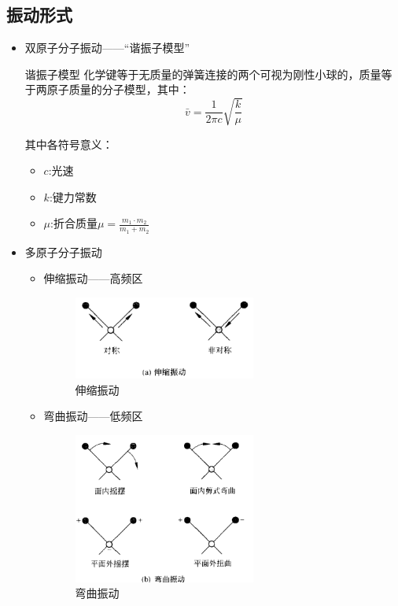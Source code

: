 \subsection{振动形式}
\begin{itemize}
    \item 双原子分子振动——“谐振子模型”
    \begin{theorem*}{谐振子模型}
        化学键等于无质量的弹簧连接的两个可视为刚性小球的，质量等于两原子质量的分子模型，其中：
        \begin{equation*}
            \bar{v}=\frac{1}{2\pi c}\sqrt{\frac{k}{\mu}}
        \end{equation*}
        
        其中各符号意义：
            \begin{itemize}
                \item $c$:光速
                \item $k$:键力常数
                \item $\mu$:折合质量$\mu=\frac{m_{1}\cdot m_{2}}{m_{1}+m_{2}}$
            \end{itemize}
    \end{theorem*}
    \item 多原子分子振动
    \begin{itemize}
        \item 伸缩振动——高频区
        \begin{figure}[ht]
            \centering
            \includegraphics[width=6cm]{image/chp5_flex_vir.png}
            \caption{伸缩振动}
            \label{fig:flex}
       \end{figure}
        \item 弯曲振动——低频区
        \begin{figure}[ht]
            \centering
            \includegraphics[width=6cm]{image/chp5_twi_vir.png}
            \caption{弯曲振动}
            \label{fig:twist}
       \end{figure}
    \end{itemize}
\end{itemize}

